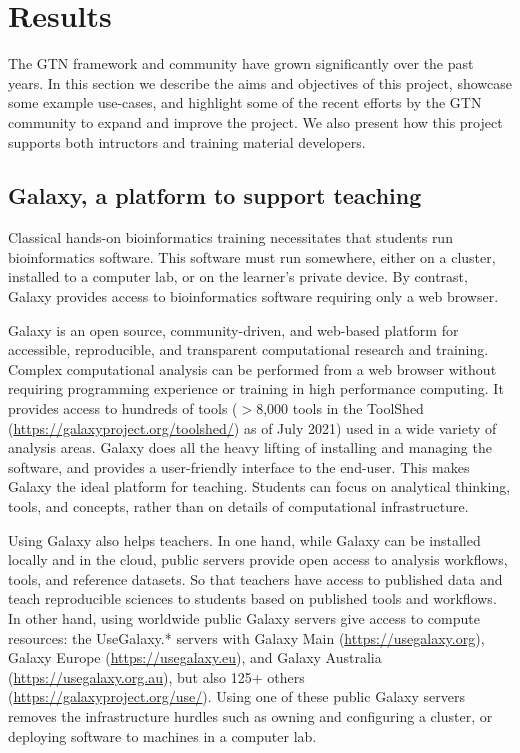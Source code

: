 \documentclass[10pt,letterpaper]{article}
\begin{document}
\section*{Results}

The GTN framework and community have grown significantly over the past years. In this section we describe the aims and objectives of this project, showcase some example use-cases, and highlight some of the recent efforts by the GTN community to expand and improve the project. We also present how this project supports both intructors and training material developers.


\subsection*{Galaxy, a platform to support teaching}

Classical hands-on bioinformatics training necessitates that students run bioinformatics software. This software must run somewhere, either on a cluster, installed to a computer lab, or on the learner's private device. By contrast, Galaxy provides access to bioinformatics software requiring only a web browser.

Galaxy \cite{Jalili2020} is an open source, community-driven, and web-based platform for accessible, reproducible, and transparent computational research and training. Complex computational analysis can be performed from a web browser without requiring programming experience or training in high performance computing. It provides access to hundreds of tools ($>$8,000 tools in the ToolShed (\url{https://galaxyproject.org/toolshed/}) as of July 2021) used in a wide variety of analysis areas. Galaxy does all the heavy lifting of installing and managing the software, and provides a user-friendly interface to the end-user. This makes Galaxy the ideal platform for teaching. Students can focus on analytical thinking, tools, and concepts, rather than on details of computational infrastructure. 


Using Galaxy also helps teachers. In one hand, while Galaxy can be installed locally and in the cloud, public servers provide open access to analysis workflows, tools, and reference datasets. So that teachers have access to published data and teach reproducible sciences to students based on published tools and workflows. In other hand, using worldwide public Galaxy servers give access to compute resources: the UseGalaxy.* servers with Galaxy Main (\url{https://usegalaxy.org}), Galaxy Europe (\url{https://usegalaxy.eu}), and Galaxy Australia (\url{https://usegalaxy.org.au}), but also 125+ others (\url{https://galaxyproject.org/use/}). Using one of these public Galaxy servers removes the infrastructure hurdles such as owning and configuring a cluster, or deploying software to machines in a computer lab.
\end{document}
